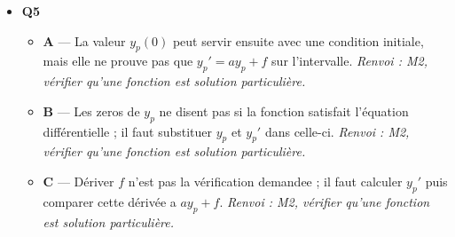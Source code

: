 \begin{itemize}
  \begin{itemize}
    \item \textbf{A} — Pour $y_0=12$, on a $3y_0-12=24$ au lieu de $0$ ; cette constante n'est donc pas une solution particulière. \emph{Renvoi : M2, solution particulière constante de $y'=ay+b$.}
    \item \textbf{B} — Pour la constante $y_0=-4$, le membre de gauche vaut $0$ mais $3y_0-12=-24$ ; l'équation n'est pas verifiee. \emph{Renvoi : M2, solution particulière constante de $y'=ay+b$.}
    \item \textbf{D} — Pour $y_0=-36$, le second membre vaut $3(-36)-12=-120$, tandis que la dérivée de la constante vaut $0$. \emph{Renvoi : M2, solution particulière constante de $y'=ay+b$.}
  \end{itemize}
  \item \textbf{Q5}
  \begin{itemize}
    \item \textbf{A} — La valeur $y_p(0)$ peut servir ensuite avec une condition initiale, mais elle ne prouve pas que $y_p'=ay_p+f$ sur l'intervalle. \emph{Renvoi : M2, vérifier qu'une fonction est solution particulière.}
    \item \textbf{B} — Les zeros de $y_p$ ne disent pas si la fonction satisfait l'équation différentielle ; il faut substituer $y_p$ et $y_p'$ dans celle-ci. \emph{Renvoi : M2, vérifier qu'une fonction est solution particulière.}
    \item \textbf{C} — Dériver $f$ n'est pas la vérification demandee ; il faut calculer $y_p'$ puis comparer cette dérivée a $ay_p+f$. \emph{Renvoi : M2, vérifier qu'une fonction est solution particulière.}
  \end{itemize}
\end{itemize}
\fi
